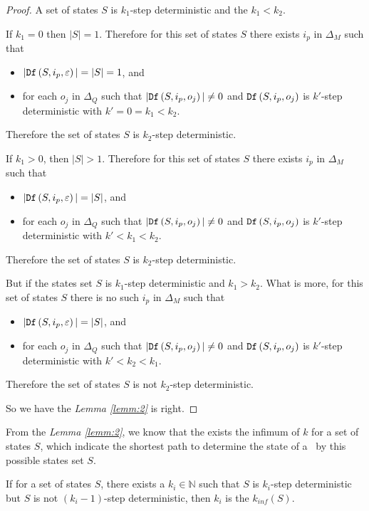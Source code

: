 \begin{proof}
 A set of states $S$ is $k_1$-step deterministic and the $k_1< k_2$. 
 
 If $k_1=0$ then $|S|=1$. Therefore for this set of states $S$ there exists $i_p$ in $\Delta_M$ such that
 \begin{itemize}
 \item  $|{\tt Df}\left(S,i_p,\varepsilon\right)|=|S|=1$, and 
 \item  for each $o_j$ in $\Delta_Q$ such that $|{\tt Df}\left(S,i_p,o_j\right)|\neq 0$ and ${\tt Df}\left(S,i_p,o_j\right)$ is $k'$-step deterministic with  ${k'}=0=k_1< k_2$.
 \end{itemize}
 Therefore the set of states $S$ is $k_2$-step deterministic.
 
 If $k_1>0$, then $|S|>1$. Therefore for this set of states $S$ there exists $i_p$ in $\Delta_M$ such that
 \begin{itemize}
 \item  $|{\tt Df}\left(S,i_p,\varepsilon\right)|=|S|$, and 
 \item  for each $o_j$ in $\Delta_Q$ such that $|{\tt Df}\left(S,i_p,o_j\right)|\neq 0$ and ${\tt Df}\left(S,i_p,o_j\right)$ is $k'$-step deterministic with  ${k'}<k_1< k_2$.
 \end{itemize}
 Therefore the set of states $S$ is $k_2$-step deterministic.

 But if the states set $S$ is $k_1$-step deterministic and $k_1> k_2$. What is more, for this set of states $S$ there is no such $i_p$ in $\Delta_M$ such that
 \begin{itemize}
 \item  $|{\tt Df}\left(S,i_p,\varepsilon\right)|=|S|$, and 
 \item  for each $o_j$ in $\Delta_Q$ such that $|{\tt Df}\left(S,i_p,o_j\right)|\neq 0$ and ${\tt Df}\left(S,i_p,o_j\right)$ is $k'$-step deterministic with  ${k'}<k_2<k_1$.
 \end{itemize}
 Therefore the set of states $S$ is not $k_2$-step deterministic.
 
 So we have the {\em Lemma \ref{lemm:2}} is right.
\end{proof}
From the {\em Lemma \ref{lemm:2}}, we know that the exists the infimum of $k$ for a set of states $S$, which indicate the shortest path to determine the state of a \BCN\ by this possible states set $S$.
\begin{definition}[$k_{inf}(S)$] 
If for a set of states $S$, there exists a $k_i\in \mathbb{N}$ such that $S$ is $k_i$-step deterministic but $S$ is not $(k_{i}-1)$-step deterministic, then $k_{i}$ is the $k_{inf}(S)$.
\end{definition}


